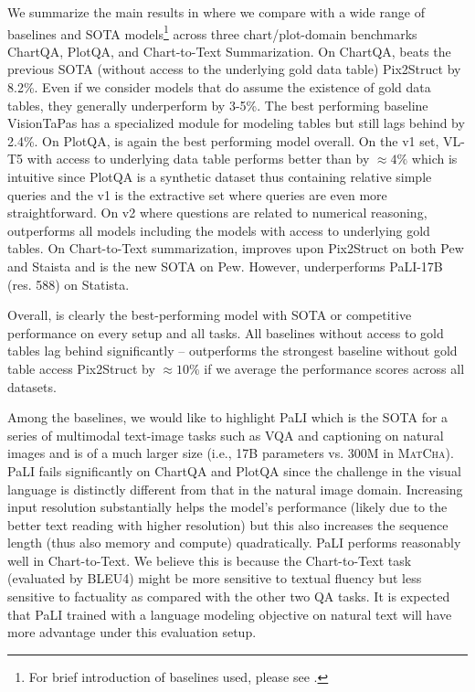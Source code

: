 We summarize the main results in  where we compare \model{} with a wide range of baselines and SOTA models\footnote{For brief introduction of baselines used, please see .} across three chart/plot-domain benchmarks ChartQA, PlotQA, and Chart-to-Text Summarization. On ChartQA, \model{} beats the previous SOTA (without access to the underlying gold data table) Pix2Struct by 8.2\%. Even if we consider models that do assume the existence of gold data tables, they generally underperform \model{} by 3-5\%. The best performing baseline VisionTaPas has a specialized module for modeling tables but still lags behind \model{} by 2.4\%. On PlotQA, \model{} is again the best performing model overall. On the v1 set, VL-T5 with access to underlying data table performs better than \model{} by $\approx4\%$ which is intuitive since PlotQA is a synthetic dataset thus containing relative simple queries and the v1 is the extractive set where queries are even more straightforward. On v2 where questions are related to numerical reasoning, \model{} outperforms all models including the models with access to underlying gold tables.  On Chart-to-Text summarization, \model{} improves upon Pix2Struct on both Pew and Staista and is the new SOTA on Pew. However, \model{} underperforms PaLI-17B (res. 588) on Statista.

Overall, \model{} is clearly the best-performing model with SOTA or competitive performance on every setup and all tasks. All baselines without access to gold tables lag behind significantly -- \model{} outperforms the strongest baseline without gold table access Pix2Struct by $\approx10\%$ if we average the performance scores across all datasets.

Among the baselines, we would like to highlight PaLI which is the SOTA for a series of multimodal text-image tasks such as VQA and captioning on natural images and is of a much larger size (i.e., 17B parameters vs. 300M in \textsc{MatCha}). PaLI fails significantly on ChartQA and PlotQA since the challenge in the visual language is distinctly different from that in the natural image domain. Increasing input resolution substantially helps the model's performance (likely due to the better text reading with higher resolution) but this also increases the sequence length (thus also memory and compute) quadratically. PaLI performs reasonably well in Chart-to-Text. We believe this is because the Chart-to-Text task (evaluated by BLEU4) might be more sensitive to textual fluency but less sensitive to factuality as compared with the other two QA tasks. It is expected that PaLI trained with a language modeling objective on natural text will have more advantage under this evaluation setup. 



